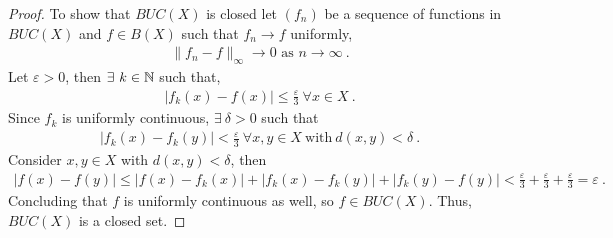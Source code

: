 \begin{questions}
\begin{solution}
\begin{proof}
To show that $BUC(X)$ is closed let $(f_n)$ be a sequence of functions in $BUC(X)$ and $f \in B(X)$ such that $f_n \rightarrow f$ uniformly,
\begin{align*}
\|f_n - f\|_{\infty} \rightarrow 0 \text{ as }n \rightarrow \infty~.
\end{align*}
Let $\varepsilon > 0$, then $\exists~k \in \mathbb{N}$ such that,
\begin{align*}
|f_k(x) - f(x)| \leq \frac{\varepsilon}{3}~\forall x \in X~.
\end{align*}
Since $f_k$ is uniformly continuous, $\exists ~\delta > 0$ such that
\begin{align*}
|f_k(x) - f_k(y)| < \frac{\varepsilon}{3}~\forall x,y \in X~ \text{with}~d(x,y) < \delta~.
\end{align*}
Consider $x,y \in X$ with $d(x,y) < \delta$, then
\begin{align*}
|f(x) - f(y)| \leq |f(x) - f_k(x)| + |f_k(x) - f_k(y)| + |f_k(y) - f(y)| < \frac{\varepsilon}{3} + \frac{\varepsilon}{3} + \frac{\varepsilon}{3} = \varepsilon~.
\end{align*}
Concluding that $f$ is uniformly continuous as well, so $f \in BUC(X)$. Thus, $BUC(X)$ is a closed set.

  \end{proof}
\end{solution}


\end{questions}